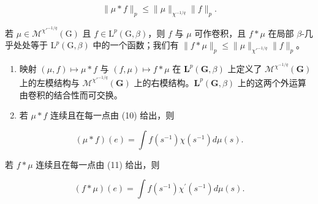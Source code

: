 \[
\| \mu * f \| _ {p} \leqslant \| \mu \| _ {\chi^ {- 1 / q}} \| f \| _ {p}.
\]

若 \(\mu \in \mathcal{M}^{\chi'^{-1/q}}(\mathrm{G})\) 且 \(f \in \mathrm{L}^p(\mathrm{G},\beta)\)，则 \(f\) 与 \(\mu\) 可作卷积，且 \(f * \mu\) 在局部 \(\beta\)-几乎处处等于 \(\mathrm{L}^p(\mathrm{G},\beta)\) 中的一个函数；我们有 \(\| f * \mu \|_p \leqslant \| \mu \|_{\chi'^{-1/q}} \| f \|_p\)。

\begin{enumerate}
\def\labelenumi{\arabic{enumi})}
\setcounter{enumi}{2}
\item
  映射 \((\mu, f) \mapsto \mu * f\) 与 \((f, \mu) \mapsto f * \mu\) 在 \(\mathbf{L}^p(\mathbf{G}, \beta)\) 上定义了 \(\mathcal{M}^{\chi^{-1/q}}(\mathbf{G})\) 上的左模结构与 \(\mathcal{M}^{\chi'^{-1/q}}(\mathbf{G})\) 上的右模结构。\(\mathbf{L}^p(\mathbf{G}, \beta)\) 上的这两个外运算由卷积的结合性而可交换。
\item
  若 \(\mu * f\) 连续且在每一点由 (10) 给出，则
\end{enumerate}

\[
(\mu * f) (e) = \int f (s ^ {- 1}) \chi (s ^ {- 1}) d \mu (s).\tag{12}
\]

若 \(f * \mu\) 连续且在每一点由 (11) 给出，则

\[
(f * \mu) (e) = \int f (s ^ {- 1}) \chi^ {\prime} (s ^ {- 1}) d \mu (s).\tag{13}
\]

